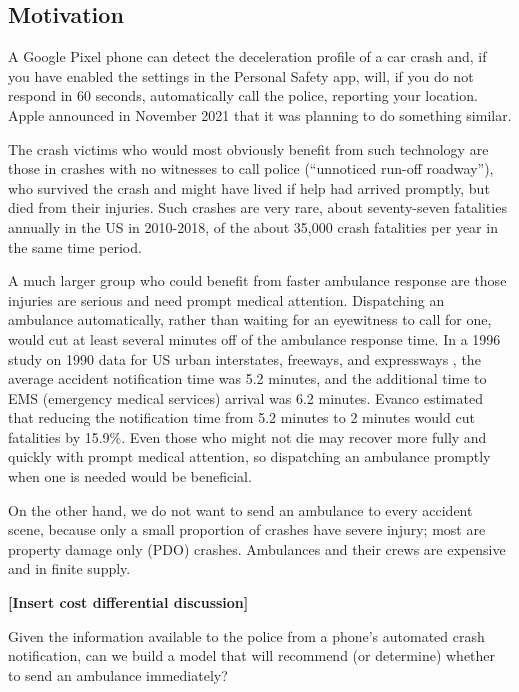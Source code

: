\subsection{Motivation}



A Google Pixel phone can detect the deceleration profile of a car crash and, if you have enabled the settings in the Personal Safety app, will, if you do not respond in 60 seconds, automatically call the police, reporting your location.  Apple announced in November 2021 that it was planning to do something similar.  

The crash victims who would most obviously benefit from such technology are those in crashes with no witnesses to call police (``unnoticed run-off roadway''), who survived the crash and might have lived if help had arrived promptly, but died from their injuries.  Such crashes are very rare, about seventy-seven fatalities annually in the US in 2010-2018,   
\citep{SPICER2021105974}
of the about 35,000 crash fatalities per year in the same time period.  \citep{FARS}

A much larger group who could benefit from faster ambulance response are those injuries are serious and need prompt medical attention.  Dispatching an ambulance automatically, rather than waiting for an eyewitness to call for one, would cut at least several minutes off of the ambulance response time.  In a 1996 study on 1990 data for US urban interstates, freeways, and expressways \citep{edsoai.on1047979037n.d.}, the average accident notification time was 5.2 minutes, and the additional time to EMS (emergency medical services) arrival was 6.2 minutes.    Evanco estimated that reducing the notification time from 5.2 minutes to 2 minutes would cut fatalities by 15.9\%.   Even those who might not die may recover more fully and quickly with prompt medical attention, so dispatching an ambulance promptly when one is needed would be beneficial.  

On the other hand, we do not want to send an ambulance to every accident scene, because only a small proportion of crashes have severe injury; most are property damage only (PDO) crashes.  Ambulances and their crews are expensive and in finite supply.  

{\bf [Insert cost differential discussion]}

Given the information available to the police from a phone's automated crash notification, can we build a model that will recommend (or determine) whether to send an ambulance immediately?  




